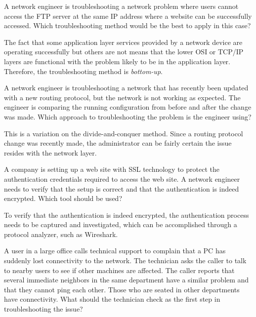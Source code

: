 \begin{example}
A network engineer is troubleshooting a network problem where users cannot access the FTP server at the same IP address where a website can be successfully accessed. Which troubleshooting method would be the best to apply in this case? 
\end{example}

\begin{solution}
The fact that some application layer services provided by a network device are operating successfully but others are not means that the lower OSI or TCP/IP layers are functional with the problem likely to be in the application layer. Therefore, the troubleshooting method is \emph{bottom-up}.
\end{solution}

\begin{example}
A network engineer is troubleshooting a network that has recently been updated with a new routing protocol, but the network is not working as expected. The engineer is comparing the running configuration from before and after the change was made. Which approach to troubleshooting the problem is the engineer using? 
\end{example}

\begin{solution}
This is a variation on the divide-and-conquer method. Since a routing protocol change was recently made, the administrator can be fairly certain the issue resides with the network layer.
\end{solution}

\begin{example}
A company is setting up a web site with SSL technology to protect the authentication credentials required to access the web site. A network engineer needs to verify that the setup is correct and that the authentication is indeed encrypted. Which tool should be used?
\end{example}

\begin{solution}
To verify that the authentication is indeed encrypted, the authentication process needs to be captured and investigated, which can be accomplished through a protocol analyzer, such as Wireshark. 
\end{solution}

\begin{example}
A user in a large office calls technical support to complain that a PC has suddenly lost connectivity to the network. The technician asks the caller to talk to nearby users to see if other machines are affected. The caller reports that several immediate neighbors in the same department have a similar problem and that they cannot ping each other. Those who are seated in other departments have connectivity. What should the technician check as the first step in troubleshooting the issue?
\end{example}

